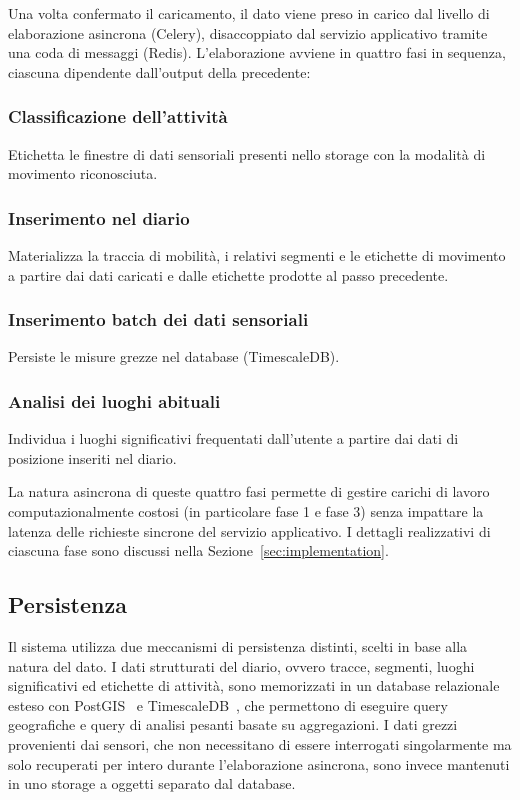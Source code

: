 \documentclass[conference]{IEEEtran}
\begin{document}
Una volta confermato il caricamento, il dato viene preso in carico dal
livello di elaborazione asincrona (Celery), disaccoppiato dal servizio
applicativo tramite una coda di messaggi (Redis).
L'elaborazione avviene in quattro
fasi in sequenza, ciascuna dipendente
dall'output della precedente:
\subsubsection{Classificazione dell'attività}

Etichetta le
finestre di dati sensoriali presenti nello storage con la modalità di movimento
riconosciuta.

\subsubsection{Inserimento nel diario}

Materializza la traccia
di mobilità, i relativi segmenti e le etichette di movimento a
partire dai dati caricati e dalle etichette prodotte al passo
precedente.

\subsubsection{Inserimento batch dei dati sensoriali}

Persiste
le misure grezze nel database (TimescaleDB).

\subsubsection{Analisi dei luoghi abituali}

Individua i
luoghi significativi frequentati dall'utente a partire dai dati di
posizione inseriti nel diario.

La natura asincrona di queste quattro fasi permette di gestire
carichi di lavoro computazionalmente costosi (in particolare fase 1 e fase 3) senza impattare la latenza delle richieste
sincrone del servizio applicativo. I dettagli realizzativi di ciascuna
fase sono discussi nella Sezione~\ref{sec:implementation}.

\subsection{Persistenza}

Il sistema utilizza due meccanismi di persistenza distinti, scelti in
base alla natura del dato. I dati strutturati del diario, ovvero tracce,
segmenti, luoghi significativi ed etichette di attività, sono
memorizzati in un database relazionale esteso con PostGIS~\cite{postgis-manual}
e TimescaleDB~\cite{timescale-hypertables}, che permettono di eseguire query
geografiche e query di analisi pesanti basate su aggregazioni. 
I dati grezzi provenienti dai sensori, che non necessitano di essere
interrogati singolarmente ma solo recuperati per intero durante
l'elaborazione asincrona, sono invece mantenuti in uno storage a
oggetti separato dal database.
\end{document}
